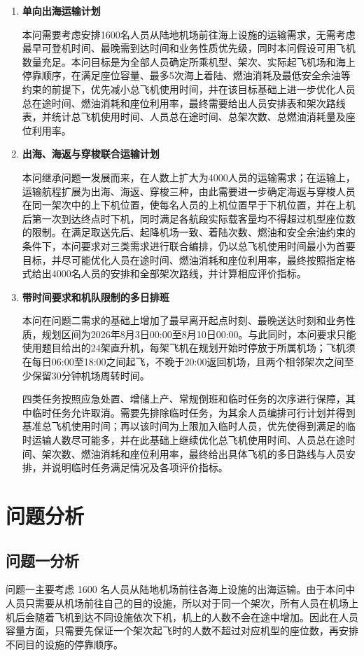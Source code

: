 \documentclass[UTF-8,a4paper,zihao=-4]{ctexart}
\begin{document}
\begin{enumerate}
    \item \textbf{单向出海运输计划}

    本问需要考虑安排1600名人员从陆地机场前往海上设施的运输需求，无需考虑最早可登机时间、最晚需到达时间和业务性质优先级，同时本问假设可用飞机数量充足。本问目标是为全部人员确定所乘机型、架次、实际起飞机场和海上停靠顺序，在满足座位容量、最多5次海上着陆、燃油消耗及最低安全余油等约束的前提下，优先减小总飞机使用时间，并在该目标基础上进一步优化人员总在途时间、燃油消耗和座位利用率，最终需要给出人员安排表和架次路线表，并统计总飞机使用时间、人员总在途时间、总架次数、总燃油消耗量及座位利用率。

    \item \textbf{出海、海返与穿梭联合运输计划}

    本问继承问题一发展而来，在人数上扩大为4000人员的运输需求；在运输上，运输航程扩展为出海、海返、穿梭三种，由此需要进一步确定海返与穿梭人员在同一架次中的上下机位置，使每名人员的上机位置早于下机位置，并在上机后第一次到达终点时下机，同时满足各航段实际载客量均不得超过机型座位数的限制。在满足取送先后、起降机场一致、着陆次数、燃油和安全余油约束的条件下，本问要求对三类需求进行联合编排，仍以总飞机使用时间最小为首要目标，并尽可能优化人员在途时间、燃油消耗和座位利用率，最终按照指定格式给出4000名人员的安排和全部架次路线，并计算相应评价指标。

    \item \textbf{带时间要求和机队限制的多日排班}

    本问在问题二需求的基础上增加了最早离开起点时刻、最晚送达时刻和业务性质，规划区间为2026年8月3日00:00至8月10日00:00。与此同时，本问要求只能使用题目给出的24架直升机，每架飞机在规划开始时停放于所属机场；飞机须在每日06:00至18:00之间起飞，不晚于20:00返回机场，且两个相邻架次之间至少保留30分钟机场周转时间。

    四类任务按照应急处置、增储上产、常规倒班和临时任务的次序进行保障，其中临时任务允许取消。需要先排除临时任务，为其余人员编排可行计划并得到基准总飞机使用时间；再以该时间为上限加入临时人员，优先使得到满足的临时运输人数尽可能多，并在此基础上继续优化总飞机使用时间、人员总在途时间、架次数、燃油消耗和座位利用率，最终给出具体飞机的多日路线与人员安排，并说明临时任务满足情况及各项评价指标。
\end{enumerate}


\section{问题分析}
\subsection{问题一分析}
问题一主要考虑 1600 名人员从陆地机场前往各海上设施的出海运输。由于本问中人员只需要从机场前往自己的目的设施，所以对于同一个架次，所有人员在机场上机后会随着飞机到达不同设施依次下机，机上的人数不会在途中增加。因此在人员容量方面，只需要先保证一个架次起飞时的人数不超过对应机型的座位数，再安排不同目的设施的停靠顺序。
\end{document}
